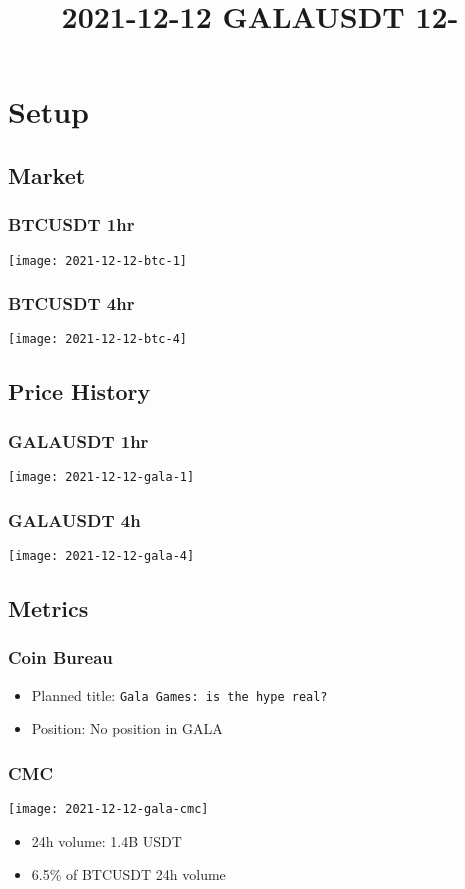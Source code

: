 \documentclass{trade}
\title{2021-12-12 GALAUSDT 12-}
\begin{document}
\maketitle

\section{Setup}
\subsection{Market}
\subsubsection{BTCUSDT 1hr}
\texttt{[image: 2021-12-12-btc-1]}
\subsubsection{BTCUSDT 4hr}
\texttt{[image: 2021-12-12-btc-4]}

\subsection{Price History}
\subsubsection{GALAUSDT 1hr}
\texttt{[image: 2021-12-12-gala-1]}
\subsubsection{GALAUSDT 4h}
\texttt{[image: 2021-12-12-gala-4]}

\subsection{Metrics}
\subsubsection{Coin Bureau}
\begin{itemize}
    \item Planned title: \verb|Gala Games: is the hype real?|
    \item Position: No position in GALA
\end{itemize}
\subsubsection{CMC}
\texttt{[image: 2021-12-12-gala-cmc]}
\begin{itemize}
    \item 24h volume: 1.4B USDT
    \item 6.5\% of BTCUSDT 24h volume
\end{itemize}
\end{document}
